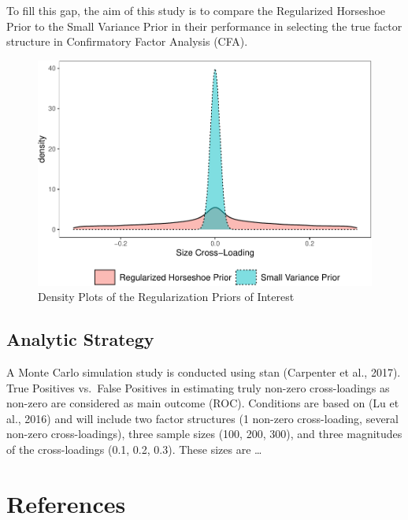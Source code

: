 \documentclass[
  english,
  man]{apa6}
\begin{document}
To fill this gap, the aim of this study is to compare the Regularized Horseshoe Prior to the Small Variance Prior in their performance in selecting the true factor structure in Confirmatory Factor Analysis (CFA).

\begin{figure}
\centering
\includegraphics{JMBKoch_Proposal_files/figure-latex/unnamed-chunk-1-1.pdf}
\caption{\label{fig:unnamed-chunk-1}Density Plots of the Regularization Priors of Interest}
\end{figure}

\hypertarget{analytic-strategy}{%
\subsection{Analytic Strategy}\label{analytic-strategy}}

A Monte Carlo simulation study is conducted using stan (Carpenter et al., 2017).
True Positives vs.~False Positives in estimating truly non-zero cross-loadings as non-zero are considered as main outcome (ROC).
Conditions are based on (Lu et al., 2016) and will include two factor structures (1 non-zero cross-loading, several non-zero cross-loadings), three sample sizes (100, 200, 300), and three magnitudes of the cross-loadings (0.1, 0.2, 0.3). These sizes are \ldots{}

\clearpage

\hypertarget{references}{%
\section{References}\label{references}}

\begingroup
\setlength{\parindent}{-0.5in}
\setlength{\leftskip}{0.5in}
\end{document}
